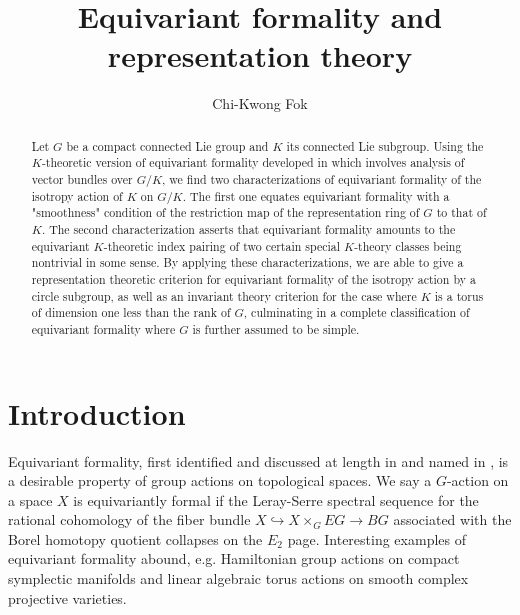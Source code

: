 \documentclass[11pt]{amsart}
\title{Equivariant formality and representation theory}
\author{Chi-Kwong Fok}
\theoremstyle{plain}
\theoremstyle{definition}
\begin{document}
\begin{abstract}
	Let $G$ be a compact connected Lie group and $K$ its connected Lie subgroup. Using the $K$-theoretic version of equivariant formality developed in \cite{F2} which involves analysis of vector bundles over $G/K$, we find two characterizations of equivariant formality of the isotropy action of $K$ on $G/K$. The first one equates equivariant formality with a "smoothness" condition of the restriction map of the representation ring of $G$ to that of $K$. The second characterization asserts that equivariant formality amounts to the equivariant $K$-theoretic index pairing of two certain special $K$-theory classes being nontrivial in some sense. By applying these characterizations, we are able to give a representation theoretic criterion for equivariant formality of the isotropy action by a circle subgroup, as well as an invariant theory criterion for the case where $K$ is a torus of dimension one less than the rank of $G$, culminating in a complete classification of equivariant formality where $G$ is further assumed to be simple.   %
\end{abstract}
\maketitle
\tableofcontents
\section{Introduction}
Equivariant formality, first identified and discussed at length in \cite{BBFMP} and named in \cite{GKM}, is a desirable property of group actions on topological spaces. We say a $G$-action on a space $X$ is equivariantly formal if the Leray-Serre spectral sequence for the rational cohomology of the fiber bundle $X\hookrightarrow X\times_G EG\to BG$ associated with the Borel homotopy quotient collapses on the $E_2$ page. Interesting examples of equivariant formality abound, e.g. Hamiltonian group actions on compact symplectic manifolds and linear algebraic torus actions on smooth complex projective varieties. 
\end{document}
